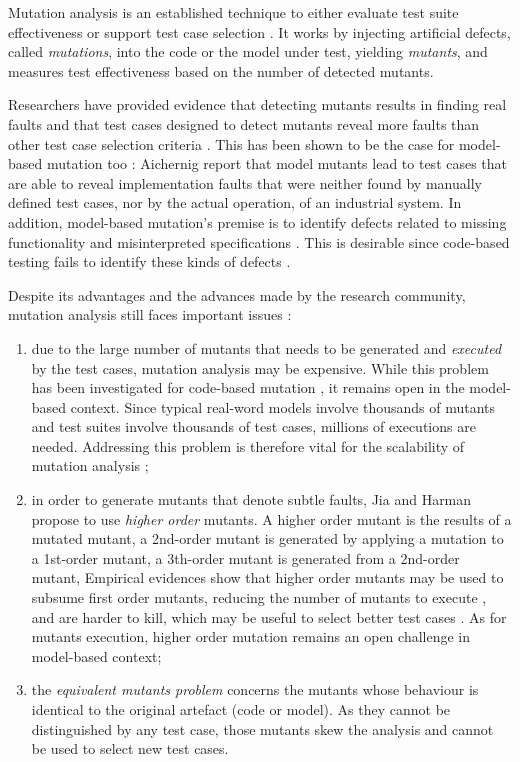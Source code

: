 
Mutation analysis is an established technique to either evaluate test suite effectiveness \cite{Andrews2006,Offutt2011,Gligoric2013} or support test case selection \cite{Papadakis2010,Fraser2014,Offutt2011}. It works by injecting artificial defects, called \emph{mutations}, into the code or the model under test, yielding \emph{mutants}, and measures test effectiveness based on the number of detected mutants.

Researchers have provided evidence that detecting mutants results in finding real faults \cite{Andrews2006,Just2014} and that test cases designed to detect mutants reveal more faults than other test case selection criteria \cite{Offutt2011,Baker2013}. This has been shown to be the case for model-based mutation too \cite{Belli2016}: Aichernig \etal \cite{Aichernig2014a} report that model mutants lead to test cases that are able to reveal  implementation faults that were neither found by manually defined test cases, nor by the actual operation, of an industrial system. In addition, model-based mutation's premise is to identify defects related to missing functionality and misinterpreted specifications \cite{Budd1985}. This is desirable since code-based testing fails to identify these kinds of defects \cite{Howden1976,Voas1997}. 

Despite its advantages and the advances made by the research community, mutation analysis still faces important issues \cite{Jia2011a}:
\begin{enumerate}
\item due to the large number of mutants that needs to be generated and \emph{executed} by the test cases, mutation analysis may be expensive. While this problem has been investigated for code-based mutation \cite{Just2014a,Papadakis2011}, it remains open in the model-based context. Since typical real-word models involve thousands of mutants and test suites involve thousands of test cases, millions of executions are needed. Addressing this problem is therefore vital for the scalability of mutation analysis \cite{Jia2011a,Offutt2011};
%
\item in order to generate mutants that denote subtle faults, Jia and Harman \cite{Jia2008} propose to use \emph{higher order} mutants. A higher order mutant is the results of a mutated mutant, \ie a 2nd-order mutant is generated by applying a mutation to a 1st-order mutant, a 3th-order mutant is generated from a 2nd-order mutant, \etc Empirical evidences show that higher order mutants may be used to subsume first order mutants, reducing the number of mutants to execute \cite{Polo2009}, and are harder to kill, which may be useful to select better test cases \cite{Langdon2010}. As for mutants execution, higher order mutation remains an open challenge in model-based context; 
%
\item the \emph{equivalent mutants problem} concerns the mutants whose behaviour is identical to the original artefact (code or model). As they cannot be distinguished by any test case, those mutants skew the analysis and cannot be used to select new test cases.
\end{enumerate}

